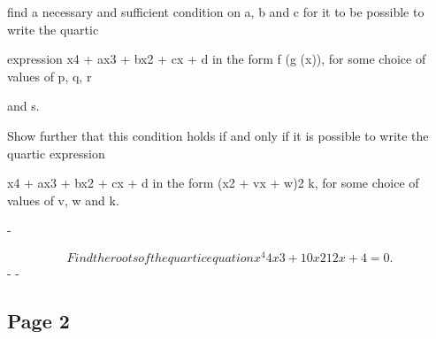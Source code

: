 \documentclass[12pt]{article}
\begin{document}
\begin{flushleft}
find a necessary and sufficient condition on a, b and c for it to be possible to write the quartic\par
expression x4 + ax3 + bx2 + cx + d in the form f (g (x)), for some choice of values of p, q, r\par
and s.\par
Show further that this condition holds if and only if it is possible to write the quartic expression\par
x4 + ax3 + bx2 + cx + d in the form (x2 + vx + w)2 k, for some choice of values of v, w and k.\par
-\par
\[Find the roots of the quartic equation x^4 4x3 + 10x2 12x + 4 = 0 .\]
- -\par
\end{flushleft}
\subsection*{Page 2}
\end{document}
